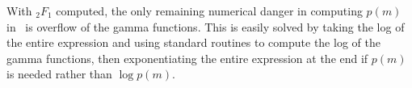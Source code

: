 With ${_2F_1}$ computed, the only remaining numerical danger in computing
$p(m)$ in~ is overflow of the gamma functions.
This is easily solved by taking the log of the entire expression
and using standard routines to compute the log of the gamma functions,
then exponentiating the entire expression at the end if $p(m)$
is needed rather than $\log p(m)$.